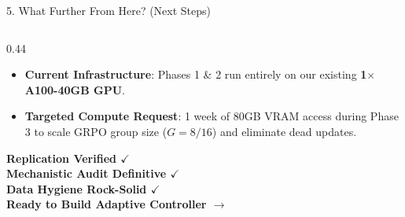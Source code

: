 \documentclass[aspectratio=169, 10pt]{beamer}
\begin{document}
\begin{frame}{5. What Further From Here? (Next Steps)}
\begin{columns}[T]
    \begin{column}{0.44\textwidth}
      \begin{tcolorbox}[successcard, title=\textbf{Feasibility \& Compute Guarantee}]
        \scriptsize
        \begin{itemize}\setlength{\itemsep}{3pt}
          \item \textbf{Current Infrastructure}: Phases 1 \& 2 run entirely on our existing \textbf{1$\times$ A100-40GB GPU}.
          \item \textbf{Targeted Compute Request}: 1 week of 80GB VRAM access during Phase 3 to scale GRPO group size ($G=8/16$) and eliminate dead updates.
        \end{itemize}
      \end{tcolorbox}
      \vspace{4pt}
      \begin{tcolorbox}[metriccard, title=\textbf{Summary Status for Professor}]
        \scriptsize
        \centering
        \textbf{Replication Verified $\checkmark$}\\
        \textbf{Mechanistic Audit Definitive $\checkmark$}\\
        \textbf{Data Hygiene Rock-Solid $\checkmark$}\\
        \textbf{Ready to Build Adaptive Controller $\rightarrow$}
      \end{tcolorbox}
    \end{column}
  \end{columns}
\end{frame}
\end{document}
